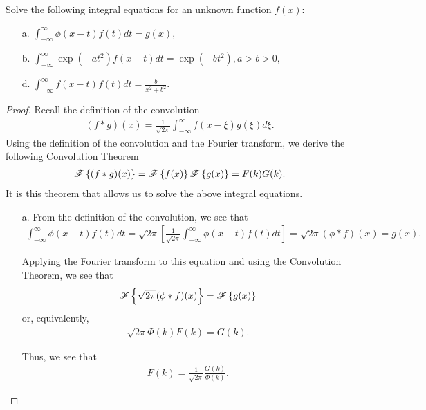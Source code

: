 \begin{problem}{2.9}
  Solve the following integral equations for an unknown function $f(x)$:
  \begin{enumerate}
    \item [a.] $\displaystyle \int_{-\infty}^{\infty} \phi(x-t) f(t) dt = g(x),$
    \item [b.] $\displaystyle \int_{-\infty}^{\infty} \exp(-at^2) f(x-t) dt = \exp(-bt^2) , a > b > 0,$
    \item [d.] $\displaystyle \int_{-\infty}^{\infty} f(x-t) f(t) dt = \frac{b}{x^2 + b^2}.$
  \end{enumerate}
\end{problem}

\begin{proof}
  Recall the definition of the convolution
  \begin{align*}
    (f \ast g)(x) = \frac{1}{\sqrt{2\pi}} \int_{-\infty}^{\infty} f(x - \xi)g(\xi) d\xi.
  \end{align*}
  Using the definition of the convolution and the Fourier transform, we derive the
  following Convolution Theorem
  \begin{align*}
    \mathscr{F}\left\{ {(f\ast g)(x)} \right\} = \mathscr{F}\left\{ {f(x)} \right\}\mathscr{F}\left\{ {g(x)} \right\} = F(k)G(k).
  \end{align*}
  It is this theorem that allows us to solve the above integral equations.

  \begin{enumerate}
    \item [a.] From the definition of the convolution, we see that
      \begin{align*}
        \int_{-\infty}^{\infty} \phi(x-t) f(t) dt =
        \sqrt{2\pi}\left[\frac{1}{\sqrt{2\pi}} \int_{-\infty}^{\infty} \phi(x-t) f(t) dt \right]
        = \sqrt{2\pi}(\phi \ast f)(x) = g(x).
      \end{align*}

      Applying the Fourier transform to this equation and using the Convolution Theorem, we see that
      \begin{align*}
        \mathscr{F}\left\{ {\sqrt{2\pi} (\phi \ast f)(x)} \right\} = \mathscr{F}\left\{ {g(x)} \right\}
      \end{align*}
      or, equivalently,
      \begin{align*}
        \sqrt{2\pi} \Phi(k)F(k) = G(k).
      \end{align*}

      Thus, we see that
      \begin{align*}
        F(k) = \frac{1}{\sqrt{2\pi}} \frac{G(k)}{\Phi(k)}.
      \end{align*}


\end{enumerate}
\end{proof}
